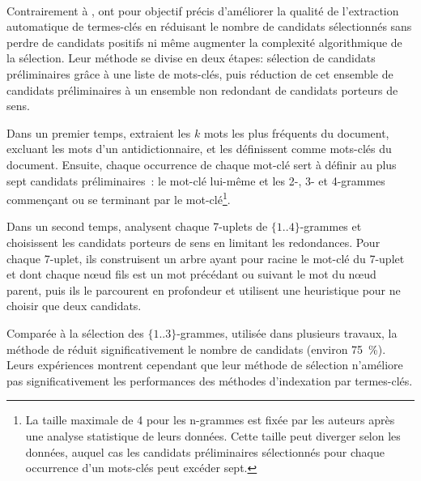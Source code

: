     ~\\Contrairement à ,
     ont pour objectif précis d'améliorer
    la qualité de l'extraction automatique de termes-clés en réduisant le nombre
    de candidats sélectionnés sans perdre de candidats positifs ni même
    augmenter la complexité algorithmique de la sélection. Leur méthode se
    divise en deux étapes: sélection de candidats préliminaires grâce à une
    liste de mots-clés, puis réduction de cet ensemble de candidats
    préliminaires à un ensemble non redondant de candidats porteurs de sens.

    Dans un premier temps,  extraient les
    $k$ mots les plus fréquents du document, excluant les mots d'un
    antidictionnaire, et les définissent comme mots-clés du document. Ensuite,
    chaque occurrence de chaque mot-clé sert à définir au plus sept candidats
    préliminaires~: le mot-clé lui-même et les 2-, 3- et 4-grammes commençant ou
    se terminant par le mot-clé\footnote{La taille maximale de 4 pour les
    n-grammes est fixée par les auteurs après une analyse statistique de leurs
    données. Cette taille peut diverger selon les données, auquel cas les
    candidats préliminaires sélectionnés pour chaque occurrence d'un mots-clés
    peut excéder sept.}.

    \begin{example}
    \end{example}

    Dans un second temps,  analysent chaque
    7-uplets de $\{1..4\}$-grammes et choisissent les candidats porteurs de sens
    en limitant les redondances. Pour chaque 7-uplet, ils construisent un arbre
    ayant pour racine le mot-clé du 7-uplet et dont chaque n\oe{}ud fils est un
    mot précédant ou suivant le mot du n\oe{}ud parent, puis ils le parcourent
    en profondeur et utilisent une heuristique pour ne choisir que deux
    candidats.


    Comparée à la sélection des $\{1..3\}$-grammes, utilisée dans plusieurs
    travaux, la méthode de  réduit
    significativement le nombre de candidats (environ 75~\%). Leurs expériences
    montrent cependant que leur méthode de sélection n'améliore pas
    significativement les performances des méthodes d'indexation par
    termes-clés.

